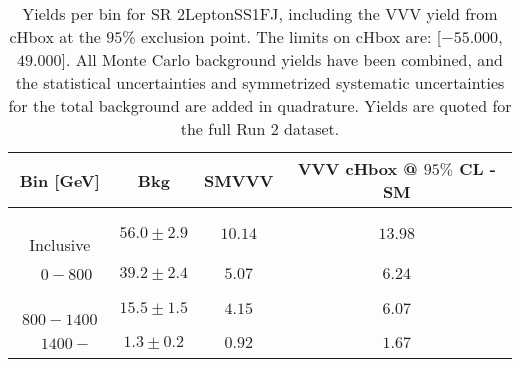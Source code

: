 \begin{table}[!htbp]
    \small
    \center
    \begin{tabular}{c||c|c|c}
    Bin [GeV] & Bkg & SMVVV & \pbox{20cm}{VVV \\ cHbox @ $95\%$ CL - SM \\ }\\
    \hline
    \pbox{20cm}{ ~ \\Inclusive\\ } & $56.0 \pm 2.9$ & $10.14$ & $13.98$\\
    \hline
    \pbox{20cm}{ ~ \\$0-800$\\ } & $39.2 \pm 2.4$ & $5.07$ & $6.24$\\
    \hline
    \pbox{20cm}{ ~ \\$800-1400$\\ } & $15.5 \pm 1.5$ & $4.15$ & $6.07$\\
    \hline
    \pbox{20cm}{ ~ \\$1400-$\\ } & $1.3 \pm 0.2$ & $0.92$ & $1.67$\\
\end{tabular}
    \caption{Yields per bin for SR 2LeptonSS1FJ, including the VVV yield from cHbox at the $95$\% exclusion point. The limits on cHbox are: [$-55.000$,~$49.000$]. All Monte Carlo background yields have been combined, and the statistical uncertainties and symmetrized systematic uncertainties for the total background are added in quadrature. Yields are quoted for the full Run 2 dataset.}
    \label{tab:2LeptonSS1FJ$binssignal}
\end{table}
